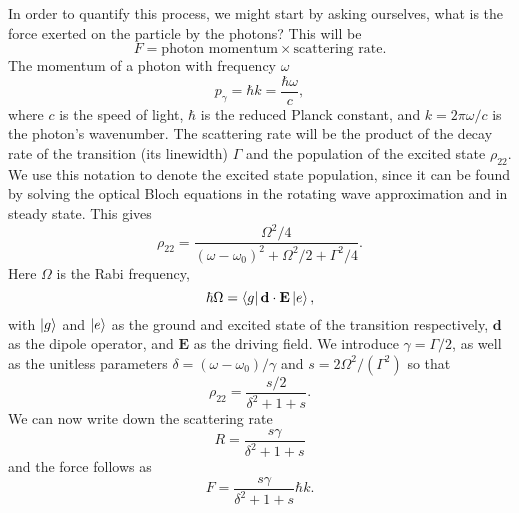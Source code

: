 In order to quantify this process, we might start by asking ourselves, what is
the force exerted on the particle by the photons? This will be
%
\begin{equation}
  F = \text{photon momentum} \times \text{scattering rate}.
\end{equation}
%
The momentum of a photon with frequency $\omega$
%
\begin{equation}
  p_\gamma = \hbar k = \frac{\hbar\omega}{c},
\end{equation}
%
where $c$ is the speed of light, $\hbar$ is the reduced Planck constant, and $k
= 2\pi\omega/c$ is the photon's wavenumber.
%
The scattering rate will be the product of the decay rate of the transition
(its linewidth) $\Gamma$ and the population of the excited state $\rho_{22}$.
We use this notation to denote the excited state population, since it can be
found by solving the optical Bloch equations in the rotating wave approximation
and in steady state. This gives~\cite{Metcalf1999}
%
\begin{equation}
\rho_{22} = \frac{\Omega^2/4}{(\omega-\omega_0)^2 + \Omega^2/2 + \Gamma^2/4}.
\end{equation}
%
Here $\Omega$ is the Rabi frequency,
%
\begin{equation}
  \hbar \Omega = \bra{g}\mathbf{d}\cdot\mathbf{E}\ket{e},
  \label{theory:eqn:rabi}
\end{equation}
%
with $\ket{g}$ and $\ket{e}$ as the ground and excited state of the
transition respectively, $\mathbf{d}$ as the dipole operator, and $\mathbf{E}$
as the driving field.
%
We introduce $\gamma=\Gamma/2$, as well as the unitless parameters $\delta =
(\omega - \omega_0)/\gamma$ and $s=2\Omega^2/(\Gamma^2)$ so that
%
\begin{equation}
  \rho_{22} = \frac{s/2}{\delta^2 + 1 + s}.
\end{equation}
%
We can now write down the scattering rate
%
\begin{equation}
  R = \frac{s\gamma}{\delta^2 + 1 + s}
  \label{theory:eqn:scatteringrate}
\end{equation}
%
and the force follows as
%
\begin{equation}
  F = \frac{s\gamma}{\delta^2 + 1 + s}\hbar k.
\end{equation}

